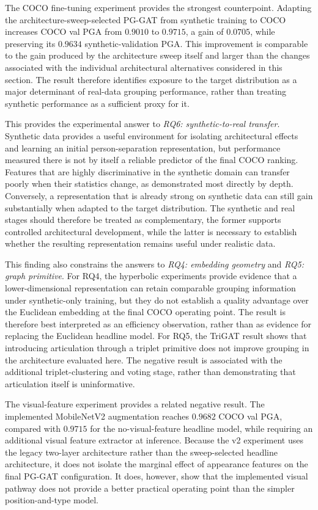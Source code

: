 The COCO fine-tuning experiment provides the strongest counterpoint.
Adapting the architecture-sweep-selected PG-GAT from synthetic training
to COCO increases COCO val PGA from $0.9010$ to $0.9715$,
a gain of $0.0705$,
while preserving its $0.9634$ synthetic-validation PGA.
This improvement is comparable to the gain produced by the architecture
sweep itself and larger than the changes associated with the individual
architectural alternatives considered in this section.
The result therefore identifies exposure to the target distribution
as a major determinant of real-data grouping performance,
rather than treating synthetic performance as a sufficient proxy for it.

This provides the experimental answer to \emph{RQ6: synthetic-to-real
transfer}.
Synthetic data provides a useful environment for isolating architectural
effects and learning an initial person-separation representation,
but performance measured there is not by itself a reliable predictor
of the final COCO ranking.
Features that are highly discriminative in the synthetic domain can
transfer poorly when their statistics change,
as demonstrated most directly by depth.
Conversely, a representation that is already strong on synthetic data
can still gain substantially when adapted to the target distribution.
The synthetic and real stages should therefore be treated as complementary,
the former supports controlled architectural development,
while the latter is necessary to establish whether the resulting
representation remains useful under realistic data.

This finding also constrains the answers to \emph{RQ4: embedding
geometry} and \emph{RQ5: graph primitive}.
For RQ4, the hyperbolic experiments provide evidence that a
lower-dimensional representation can retain comparable grouping
information under synthetic-only training,
but they do not establish a quality advantage over the Euclidean
embedding at the final COCO operating point.
The result is therefore best interpreted as an efficiency observation,
rather than as evidence for replacing the Euclidean headline model.
For RQ5, the TriGAT result shows that introducing articulation through
a triplet primitive does not improve grouping in the architecture
evaluated here.
The negative result is associated with the additional triplet-clustering
and voting stage,
rather than demonstrating that articulation itself is uninformative.

The visual-feature experiment provides a related negative result.
The implemented MobileNetV2 augmentation reaches $0.9682$ COCO val PGA,
compared with $0.9715$ for the no-visual-feature headline model,
while requiring an additional visual feature extractor at inference.
Because the v2 experiment uses the legacy two-layer architecture rather
than the sweep-selected headline architecture,
it does not isolate the marginal effect of appearance features on the
final PG-GAT configuration.
It does, however, show that the implemented visual pathway does not
provide a better practical operating point than the simpler
position-and-type model.

